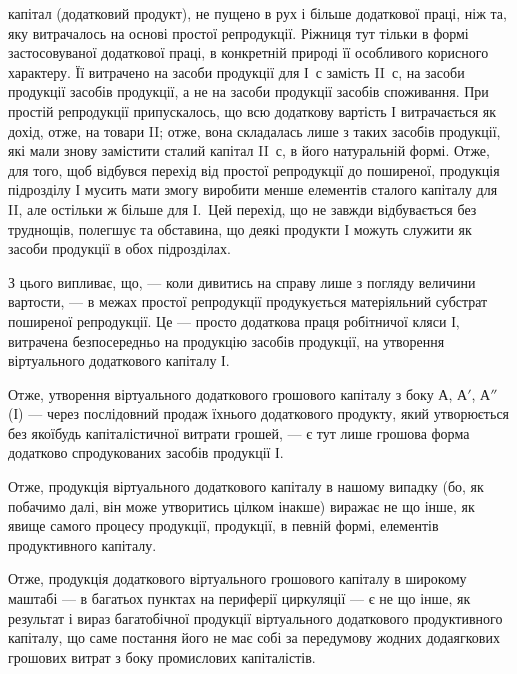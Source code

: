 \parcont{}  %
капітал (додатковий продукт), не пущено в рух і більше додаткової праці,
ніж та, яку витрачалось на основі простої репродукції. Ріжниця тут
тільки в формі застосовуваної додаткової праці, в конкретній природі її
особливого корисного характеру. Її витрачено на засоби продукції для
І~$с$ замість II~$с$, на засоби продукції засобів продукції, а не на засоби
продукції засобів споживання. При простій репродукції припускалось,
що всю додаткову вартість І витрачається як дохід, отже, на товари II;
отже, вона складалась лише з таких засобів продукції, які мали знову
замістити сталий капітал II~$с$, в його натуральній формі. Отже, для того,
щоб відбувся перехід від простої репродукції до поширеної, продукція підрозділу
І мусить мати змогу виробити менше елементів сталого капіталу
для II, але остільки ж більше для І.~Цей перехід, що не завжди відбувається
без труднощів, полегшує та обставина, що деякі продукти І
можуть служити як засоби продукції в обох підрозділах.

З цього випливає, що, — коли дивитись на справу лише з погляду величини
вартости, — в межах простої репродукції продукується матеріяльний
субстрат поширеної репродукції. Це — просто додаткова праця робітничої
кляси І, витрачена безпосередньо на продукцію засобів продукції, на утворення
віртуального додаткового капіталу І.

Отже, утворення віртуального додаткового грошового капіталу з боку
$А$, $А'$, $А''$ (І) — через послідовний продаж їхнього додаткового продукту,
який утворюється без якоїбудь капіталістичної витрати грошей, — є тут
лише грошова форма додатково спродукованих засобів продукції І.

Отже, продукція віртуального додаткового капіталу в нашому випадку
(бо, як побачимо далі, він може утворитись цілком інакше) виражає не
що інше, як явище самого процесу продукції, продукції, в певній формі,
елементів продуктивного капіталу.

Отже, продукція додаткового віртуального грошового капіталу в широкому
маштабі — в багатьох пунктах на периферії циркуляції — є не що
інше, як результат і вираз багатобічної продукції віртуального додаткового
продуктивного капіталу, що саме постання його не має собі за передумову
жодних додаягкових грошових витрат з боку промислових капіталістів.


